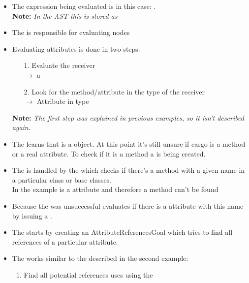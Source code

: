 \documentclass[12pt,halfparskip,DIV11,BCOR10mm]{scrreprt}
\begin{document}
\begin{itemize}
    \item The expression being evaluated is in this case: . \\
          \textbf{Note:} \emph{In the AST this is stored as }
    \item The  is responsible for evaluating  nodes
    \item Evaluating attributes is done in two steps:
    \begin{itemize}
        \item[1.] Evaluate the receiver \\$\rightarrow$ a
        \item[2.] Look for the method/attribute in the type of the receiver \\ $\rightarrow$ Attribute  in type 
    \end{itemize}
    \item[] \textbf{Note:} \emph{The first step was explained in previous examples, so it isn't described again.}
    \item The  learns that  is a  object. At this point it's still unsure if cargo is a method or a real attribute. To check if it is a method a  is being created.
    \item The  is handled by the  which checks if there's a method with a given name in a particular class or base classes.\\
          In the example  is a attribute and therefore a method can't be found
    \item Because the  was unsuccessful  evaluates if there is a attribute with this name by issuing a .
    \item The  starts by creating an {AttributeReferencesGoal} which tries to find all references of a particular attribute.
    \item The  works similar to the  described in the second example:
    \begin{enumerate}
        \item Find all potential references uses using the 

\end{enumerate}
\end{itemize}
\end{document}
